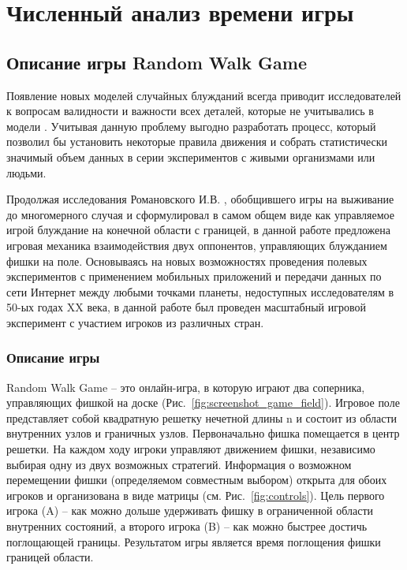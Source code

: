 \chapter{Численный анализ времени игры}\label{ch:ch3}


\section{Описание игры Random Walk Game}\label{sec:ch3/sec1}

Появление новых моделей случайных блужданий всегда приводит исследователей к вопросам валидности и важности всех деталей, которые не учитывались в модели 
\cite{pyke_understanding_2015, lascala-gruenewald_sensory_2019}.
Учитывая данную проблему выгодно разработать процесс, который позволил бы установить некоторые правила движения и собрать статистически значимый 
объем данных в серии экспериментов с живыми организмами или людьми. 

Продолжая исследования Романовского И.В. \cite{romanovsky_1961}, обобщившего игры на выживание до многомерного случая и сформулировал в самом общем виде как управляемое игрой 
блуждание на конечной области с границей, в данной работе предложена игровая механика взаимодействия двух оппонентов, управляющих блужданием 
фишки на поле. Основываясь на новых возможностях проведения полевых экспериментов с применением мобильных приложений и 
передачи данных по сети Интернет между любыми точками планеты, недоступных исследователям в 50-ых годах XX века, в данной работе был проведен масштабный игровой эксперимент 
с участием игроков из различных стран.

\subsection{Описание игры}\label{subsec:ch3/sec1/sub1}

Random Walk Game -- это онлайн-игра, в которую играют два соперника, управляющих фишкой на доске (Рис.~\cref{fig:screenshot_game_field}). Игровое поле представляет собой квадратную решетку нечетной длины n и состоит из области внутренних узлов и граничных узлов. Первоначально фишка помещается в центр решетки. На каждом ходу игроки управляют движением фишки, независимо выбирая одну из двух возможных стратегий. Информация о возможном перемещении фишки (определяемом совместным выбором) открыта для обоих игроков и организована в виде матрицы (см. Рис.~\cref{fig:controls}). Цель первого игрока (A) -- как можно дольше удерживать фишку в ограниченной области внутренних состояний, а второго игрока (B) -- как можно быстрее достичь поглощающей границы. Результатом игры является время поглощения фишки границей области.
    
